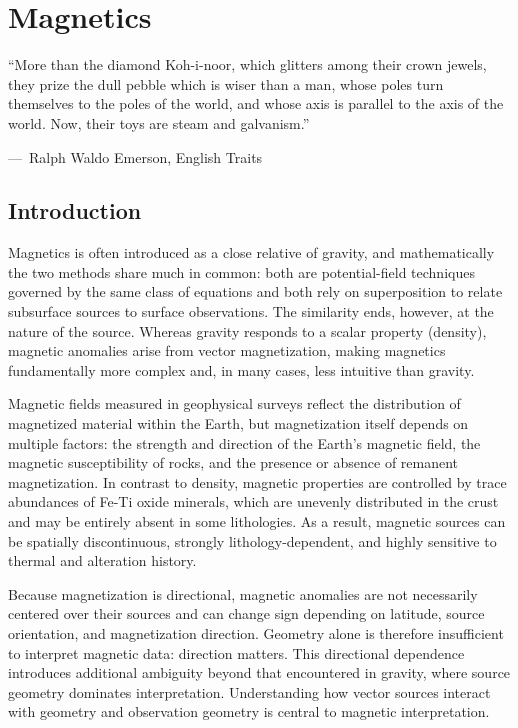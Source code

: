 \chapter{Magnetics}\label{ch:magnetics}

\epigraph{ ``More than the diamond Koh-i-noor, which glitters among their crown jewels, they prize the dull pebble which is wiser than a man, whose poles turn themselves to the poles of the world, and whose axis is parallel to the axis of the world.  Now, their toys are steam and galvanism.''}
{{\normalfont ---\ Ralph Waldo Emerson}, English Traits}

\section{Introduction}
Magnetics is often introduced as a close relative of gravity, and mathematically the two methods share much in common: both are potential-field techniques governed by the same class of equations and both rely on superposition to relate subsurface sources to surface observations. The similarity ends, however, at the nature of the source. Whereas gravity responds to a scalar property (density), magnetic anomalies arise from vector magnetization, making magnetics fundamentally more complex and, in many cases, less intuitive than gravity.

Magnetic fields measured in geophysical surveys reflect the distribution of magnetized material within the Earth, but magnetization itself depends on multiple factors: the strength and direction of the Earth's magnetic field, the magnetic susceptibility of rocks, and the presence or absence of remanent magnetization. In contrast to density, magnetic properties are controlled by trace abundances of Fe-Ti oxide minerals, which are unevenly distributed in the crust and may be entirely absent in some lithologies. As a result, magnetic sources can be spatially discontinuous, strongly lithology-dependent, and highly sensitive to thermal and alteration history.

Because magnetization is directional, magnetic anomalies are not necessarily centered over their sources and can change sign depending on latitude, source orientation, and magnetization direction. Geometry alone is therefore insufficient to interpret magnetic data: direction matters. This directional dependence introduces additional ambiguity beyond that encountered in gravity, where source geometry dominates interpretation. Understanding how vector sources interact with geometry and observation geometry is central to magnetic interpretation.

